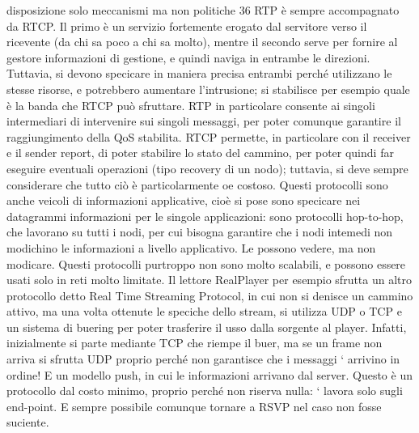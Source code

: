 disposizione solo meccanismi ma non politiche
36
RTP è sempre accompagnato da RTCP. Il primo è un servizio fortemente
erogato dal servitore verso il ricevente (da chi sa poco a chi sa molto), mentre
il secondo serve per fornire al gestore informazioni di gestione, e quindi naviga
in entrambe le direzioni. Tuttavia, si devono specicare in maniera precisa entrambi perché utilizzano le stesse risorse,
e potrebbero aumentare l'intrusione;
si stabilisce per esempio quale è la banda che RTCP può sfruttare. RTP in
particolare consente ai singoli intermediari di intervenire sui singoli messaggi,
per poter comunque garantire il raggiungimento della QoS stabilita. RTCP permette, in particolare con il receiver e il
sender report, di poter stabilire lo stato
del cammino, per poter quindi far eseguire eventuali operazioni (tipo recovery
di un nodo); tuttavia, si deve sempre considerare che tutto ciò è particolarmente
oe
costoso.
Questi protocolli sono anche veicoli di informazioni applicative, cioè si pose
sono specicare nei datagrammi informazioni per le singole applicazioni: sono
protocolli hop-to-hop, che lavorano su tutti i nodi, per cui bisogna garantire che
i nodi intemedi non modichino le informazioni a livello applicativo. Le possono
vedere, ma non modicare.
Questi protocolli purtroppo non sono molto scalabili, e possono essere usati
solo in reti molto limitate. Il lettore RealPlayer per esempio sfrutta un altro
protocollo detto Real Time Streaming Protocol, in cui non si denisce un cammino attivo, ma una volta ottenute le
speciche dello stream, si utilizza UDP
o TCP e un sistema di buering per poter trasferire il usso dalla sorgente al
player. Infatti, inizialmente si parte mediante TCP che riempe il buer, ma se
un frame non arriva si sfrutta UDP proprio perché non garantisce che i messaggi
`
arrivino in ordine! E un modello push, in cui le informazioni arrivano dal server. Questo è un protocollo dal costo
minimo, proprio perché non riserva nulla:
`
lavora solo sugli end-point. E sempre possibile comunque tornare a RSVP nel
caso non fosse suciente.
